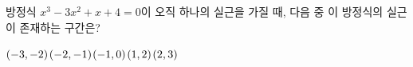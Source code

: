 방정식 $x^3-3x^2+x+4=0$이 오직 하나의 실근을 가질 때, 다음 중 이 방정식의 실근이 존재하는 구간은?
\begin{choices32}{$(-3{,}\mkern3mu\mathopen{}-2)$}{$(-2{,}\mkern3mu\mathopen{}-1)$}{$(-1{,}\mkern3mu\mathopen{}0)$}{$(1{,}\mkern3mu\mathopen{}2)$}{$(2{,}\mkern3mu\mathopen{}3)$}\end{choices32}
